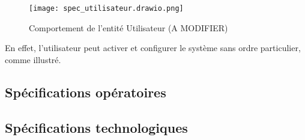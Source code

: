 \begin{figure}[H]
	\centering
	\texttt{[image: spec\_utilisateur.drawio.png]}
	\caption{Comportement de l'entité Utilisateur (A MODIFIER)}
	\label{fig:spec_utilisateur}
\end{figure}

En effet, l'utilisateur peut activer et configurer le système sans ordre particulier, comme illustré.

\subsection{Spécifications opératoires}
\subsection{Spécifications technologiques}
